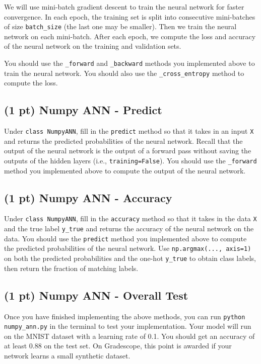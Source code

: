 \documentclass[11pt]{exam}
\begin{document}
We will use mini-batch gradient descent to train the neural network for faster convergence. In each epoch, the training set is split into consecutive mini-batches of size \verb|batch_size| (the last one may be smaller). Then we train the neural network on each mini-batch. After each epoch, we compute the loss and accuracy of the neural network on the training and validation sets.

You should use the \verb|_forward| and \verb|_backward| methods you implemented above to train the neural network. You should also use the \verb|_cross_entropy| method to compute the loss.

\subsection{(1 pt) Numpy ANN - Predict}

Under \verb|class NumpyANN|, fill in the \verb|predict| method so that it takes in an input \verb|X| and returns the predicted probabilities of the neural network. Recall that the output of the neural network is the output of a forward pass without saving the outputs of the hidden layers (i.e., \verb|training=False|). You should use the \verb|_forward| method you implemented above to compute the output of the neural network.

\subsection{(1 pt) Numpy ANN - Accuracy}

Under \verb|class NumpyANN|, fill in the \verb|accuracy| method so that it takes in the data \verb|X| and the true label \verb|y_true| and returns the accuracy of the neural network on the data. You should use the \verb|predict| method you implemented above to compute the predicted probabilities of the neural network. Use \verb|np.argmax(..., axis=1)| on both the predicted probabilities and the one-hot \verb|y_true| to obtain class labels, then return the fraction of matching labels.

\subsection{(1 pt) Numpy ANN - Overall Test}

Once you have finished implementing the above methods, you can run \verb|python numpy_ann.py| in the terminal to test your implementation. Your model will run on the MNIST dataset with a learning rate of 0.1. You should get an accuracy of at least 0.88 on the test set. On Gradescope, this point is awarded if your network learns a small synthetic dataset.
\end{document}
